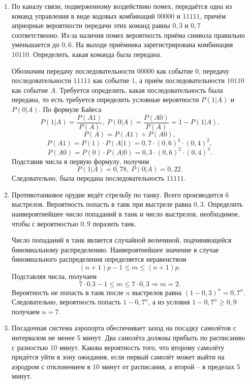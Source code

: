 \begin{enumerate}
    \item По каналу связи, подверженному воздействию помех, передаётся одна из
        команд управления в виде кодовых комбинаций \( 00000 \) и \( 11111 \),
        причём априорные вероятности передачи этих команд равны \( 0,3 \) и
        \( 0,7 \) соответственно. Из-за наличия помех вероятность приёма символа
        правильно уменьшается до \( 0,6 \). На выходе приёмника зарегистрирована
        комбинация \( 10110 \). Определить, какая команда была передана.

        Обозначим передачу последовательности \( 00000 \) как событие \( 0 \),
        передачу последовательности \( 11111 \) как событие \( 1 \), а приём
        последовательности \( 10110 \) как событие \( A \). Требуется
        определить, какая последовательность была передана, то есть требуется
        определить условные вероятности \( P(1|A) \) и \( P(0|A) \). По формуле
        Байеса
        \[
            P(1|A) = \frac{P(A1)}{P(A)},\ P(0|A) = \frac{P(A0)}{P(A)} =
            1 - P(1|A).
        \]
        \[
            P(A) = P(A1) + P(A0),
        \]
        \[
            P(A1) = P(1) \cdot P(A|1) = 0,7\cdot(0,6)^3\cdot(0,4)^2,
        \]
        \[
            P(A0) = P(0) \cdot P(A|0) = 0,3\cdot(0,6)^2\cdot(0,4)^3.
        \]
        Подставив числа в первую формулу, получим
        \[
            P(1|A) = 0,78,\ P(0|A) = 0,22.
        \]
        Следовательно, была передана последовательность \( 11111 \).

    \item Противотанковое орудие ведёт стрельбу по танку. Всего производится 6
        выстрелов. Вероятность попасть в танк при выстреле равна \( 0,3 \).
        Определить наивероятнейшее число попаданий в танк и число выстрелов,
        необходимое, чтобы с вероятностью \( 0,9 \) поразить танк.

        Число попаданий в танк является случайной величиной, подчиняющейся
        биномиальному распределению. Наивероятнейшее значение в случае
        биномиального распределения определяется неравенством
        \[
            (n+1)p - 1 \le m \le (n+1)p.
        \]
        Подставляя числа, получаем
        \[
            7\cdot0.3 - 1 \le m \le 7\cdot0,3 \Rightarrow m = 2.
        \]
        Вероятность не попасть в танк после \( n \) выстрелов равна
        \( (1 - 0,3)^n = 0,7^n \). Следовательно, вероятность попасть
        \( 1 - 0,7^n \), а из условия \( 1 - 0,7^n \ge 0,9 \) получаем
        \( n = 7 \).

    \item Посадочная система аэропорта обеспечивает заход на посадку самолётов с
        интервалом не менее 5 минут. Два самолёта должны прибыть по расписанию с
        разностью 10 минут. Какова вероятность того, что второму самолёту
        придётся уйти в зону ожидания, если первый самолёт может выйти на
        аэродром с отклонением в 10 минут от расписания, а второй -- в пределах
        5 минут.


\end{enumerate}
